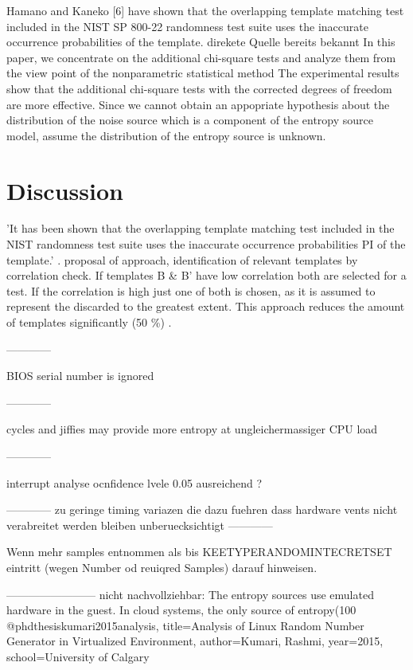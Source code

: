 Hamano and Kaneko [6] have shown that the
overlapping template matching test included in the NIST SP
800-22 randomness test suite uses the inaccurate occurrence
probabilities of the template.
 \cite{kangadditional} direkete Quelle bereits bekannt
In this paper, we concentrate on the additional chi-square tests and analyze them from the view point of the nonparametric
 statistical method \cite{kangadditional}
The experimental results show that the additional chi-square tests with the corrected degrees of freedom are more effective. \cite{kangadditional}
 Since we cannot obtain an appopriate hypothesis about the distribution of the noise source which is a component of the entropy source model, assume the distribution of the entropy source is unknown. \cite{kangadditional}




\section{Discussion}

'It has been shown that the overlapping template matching test included in the NIST randomness test suite uses the inaccurate occurrence probabilities PI of the template.'
\cite{hamano2007correction,chen2016templates}. \cite{chen2016templates} proposal of approach, identification of relevant templates by correlation check. If templates B \&  B' have low correlation
both are selected for a test. If the correlation is high just one of both is chosen, as it is assumed to represent the discarded to the greatest extent. This approach reduces the amount of templates significantly (50 \%) \cite{chen2016templates}.

------------

BIOS serial number is ignored

------------

cycles and jiffies may provide more entropy at ungleichermassiger CPU load

------------

interrupt analyse ocnfidence lvele 0.05 ausreichend ?

------------
zu geringe timing variazen die dazu fuehren dass hardware vents nicht verabreitet werden bleiben unberuecksichtigt
------------

 Wenn mehr samples entnommen als bis KEETYPERANDOMINTECRETSET eintritt (wegen Number od reuiqred Samples) darauf hinweisen.
 
 ------------------------
 nicht nachvollziehbar:
  The entropy sources use emulated hardware in the guest. In cloud systems, the only source of entropy(100%
 @phdthesis{kumari2015analysis,
     title={Analysis of Linux Random Number Generator in Virtualized Environment},
     author={Kumari, Rashmi},
     year={2015},
     school={University of Calgary}
 }
 
